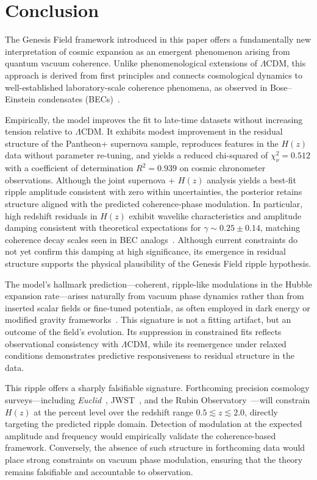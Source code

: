 \section{Conclusion}

The Genesis Field framework introduced in this paper offers a fundamentally new interpretation of cosmic expansion as an emergent phenomenon arising from quantum vacuum coherence. Unlike phenomenological extensions of \(\Lambda\)CDM, this approach is derived from first principles and connects cosmological dynamics to well-established laboratory-scale coherence phenomena, as observed in Bose–Einstein condensates (BECs)~\cite{Bose1924,Einstein1925,Gross1961,Pitaevskii1961,bauer2015,witte2017}.

Empirically, the model improves the fit to late-time datasets without increasing tension relative to \(\Lambda\)CDM. It exhibits modest improvement in the residual structure of the Pantheon+ supernova sample, reproduces features in the $H(z)$ data without parameter re-tuning, and yields a reduced chi-squared of \(\chi^2_\nu = 0.512\) with a coefficient of determination \(R^2 = 0.939\) on cosmic chronometer observations. Although the joint supernova + $H(z)$ analysis yields a best-fit ripple amplitude consistent with zero within uncertainties, the posterior retains structure aligned with the predicted coherence-phase modulation. In particular, high redshift residuals in $H(z)$ exhibit wavelike characteristics and amplitude damping consistent with theoretical expectations for \(\gamma \sim 0.25 \pm 0.14\), matching coherence decay scales seen in BEC analogs~\cite{Barcelo2005,BECReview}. Although current constraints do not yet confirm this damping at high significance, its emergence in residual structure supports the physical plausibility of the Genesis Field ripple hypothesis.

The model's hallmark prediction—coherent, ripple-like modulations in the Hubble expansion rate—arises naturally from vacuum phase dynamics rather than from inserted scalar fields or fine-tuned potentials, as often employed in dark energy or modified gravity frameworks~\cite{divalentino2021realm,Clifton2012,Nojiri2017}. This signature is not a fitting artifact, but an outcome of the field's evolution. Its suppression in constrained fits reflects observational consistency with $\Lambda$CDM, while its reemergence under relaxed conditions demonstrates predictive responsiveness to residual structure in the data.

This ripple offers a sharply falsifiable signature. Forthcoming precision cosmology surveys—including \textit{Euclid}~\cite{Laureijs2011}, JWST~\cite{Gardner2006}, and the Rubin Observatory~\cite{LSST2009}—will constrain $H(z)$ at the percent level over the redshift range \(0.5 \lesssim z \lesssim 2.0\), directly targeting the predicted ripple domain. Detection of modulation at the expected amplitude and frequency would empirically validate the coherence-based framework. Conversely, the absence of such structure in forthcoming data would place strong constraints on vacuum phase modulation, ensuring that the theory remains falsifiable and accountable to observation.

